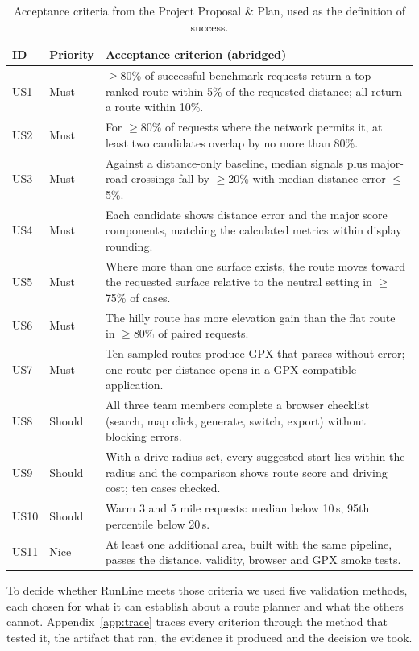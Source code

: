 \begin{table}[ht]
\centering\small
\caption{Acceptance criteria from the Project Proposal \& Plan, used as the definition of success.}
\label{tab:criteria}
\begin{tabularx}{\linewidth}{@{}l l Y@{}}
\toprule
ID & Priority & Acceptance criterion (abridged) \\
\midrule
US1 & Must & $\geq$80\% of successful benchmark requests return a top-ranked route within 5\% of the requested distance; all return a route within 10\%. \\
US2 & Must & For $\geq$80\% of requests where the network permits it, at least two candidates overlap by no more than 80\%. \\
US3 & Must & Against a distance-only baseline, median signals plus major-road crossings fall by $\geq$20\% with median distance error $\leq$5\%. \\
US4 & Must & Each candidate shows distance error and the major score components, matching the calculated metrics within display rounding. \\
US5 & Must & Where more than one surface exists, the route moves toward the requested surface relative to the neutral setting in $\geq$75\% of cases. \\
US6 & Must & The hilly route has more elevation gain than the flat route in $\geq$80\% of paired requests. \\
US7 & Must & Ten sampled routes produce GPX that parses without error; one route per distance opens in a GPX-compatible application. \\
US8 & Should & All three team members complete a browser checklist (search, map click, generate, switch, export) without blocking errors. \\
US9 & Should & With a drive radius set, every suggested start lies within the radius and the comparison shows route score and driving cost; ten cases checked. \\
US10 & Should & Warm 3 and 5 mile requests: median below 10\,s, 95th percentile below 20\,s. \\
US11 & Nice & At least one additional area, built with the same pipeline, passes the distance, validity, browser and GPX smoke tests. \\
\bottomrule
\end{tabularx}
\end{table}

To decide whether RunLine meets those criteria we used five validation
methods, each chosen for what it can establish about a route planner and what
the others cannot. Appendix~\ref{app:trace} traces every criterion through the
method that tested it, the artifact that ran, the evidence it produced and the
decision we took.

